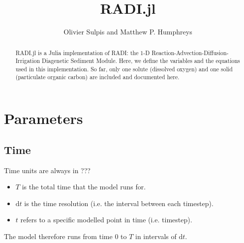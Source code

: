 \documentclass{article}
\newcommand{\D}[1]{\mathrm{d}#1}
\begin{document}
\title{RADI.jl}
\author{Olivier Sulpis and Matthew P. Humphreys}

\maketitle

\begin{abstract}
RADI.jl is a Julia implementation of RADI: the 1-D Reaction-Advection-Diffusion-Irrigation Diagenetic Sediment Module. Here, we define the variables and the equations used in this implementation. So far, only one solute (dissolved oxygen) and one solid (particulate organic carbon) are included and documented here.
\end{abstract}

%
%
%
%
%

\section{Parameters}

\subsection{Time}

Time units are always in ???
\begin{itemize}
  \item $T$ is the total time that the model runs for.
  \item $\D{t}$ is the time resolution (i.e. the interval between each timestep).
  \item $t$ refers to a specific modelled point in time (i.e. timestep).
\end{itemize}
The model therefore runs from time $0$ to $T$ in intervals of $\D{t}$.
\end{document}
